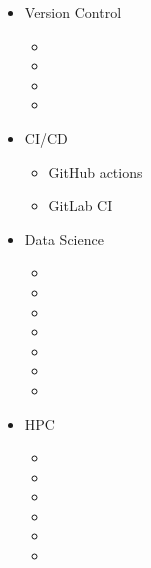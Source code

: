 \documentclass{CurriculumVitae}[10pt, condensed]
\begin{document}
  \begin{multicols}{4}
    \begin{itemize}[topsep=0pt]
      \setlength{\itemsep}{-0.3em}
    \item {\footnotesize Version Control}
      \begin{itemize}[topsep=0pt, partopsep=0pt]
        \setlength{\itemsep}{-0.3em}
      \item {}
      \item {}
      \item {}
      \item {}
      \end{itemize}
      
    \item {\footnotesize CI/CD}
      \begin{itemize}[topsep=0pt, partopsep=0pt]
        \setlength{\itemsep}{-0.3em}
      \item {\footnotesize GitHub actions}
      \item {\footnotesize GitLab CI}
      \end{itemize}
      
    \item {\footnotesize Data Science}
      \begin{itemize}[topsep=0pt, partopsep=0pt]
        \setlength{\itemsep}{-0.3em}
      \item {}
      \item {}
      \item {}
      \item {}
      \item {}
      \item {}
      \item {}
      \end{itemize}
      
    \item {\footnotesize HPC}
      \begin{itemize}[topsep=0pt, partopsep=0pt]
        \setlength{\itemsep}{-0.3em}
      \item {}
      \item {}
      \item {}
      \item {}
      \item {}
      \item {}
      \end{itemize}
      

\end{itemize}
\end{multicols}
\end{document}
